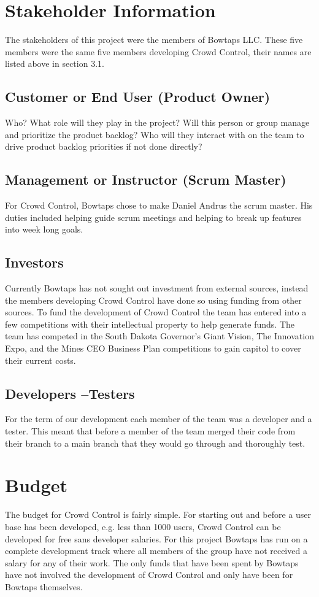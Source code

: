 \section{ Stakeholder Information}
The stakeholders of this project were the members of Bowtaps LLC.  These five members were the same five members developing Crowd Control, their names are listed above in section 3.1.


\subsection{Customer or End User (Product Owner)}
Who?  What role will they play in the project?  Will this person or group manage 
and prioritize the product backlog?  Who will they interact with on the team to 
drive product backlog priorities if not done directly? 

\subsection{Management or Instructor (Scrum Master)}
For Crowd Control, Bowtaps chose to make Daniel Andrus the scrum master. His duties included helping guide scrum meetings and helping to break up features into week long goals.


\subsection{Investors}
Currently Bowtaps has not sought out investment from external sources, instead the members developing Crowd Control have done so using funding from other sources.  To fund the development of Crowd Control the team has entered into a few competitions with their intellectual property to help generate funds.   The team has competed in the South Dakota Governor's Giant Vision, The Innovation Expo, and the Mines CEO Business Plan competitions to gain capitol to cover their current costs.


\subsection{Developers --Testers}
For the term of our development each member of the team was a developer and a tester.  This meant that before a member of the team merged their code from their branch to a main branch that they would go through and thoroughly test.

\section{Budget}
The budget for Crowd Control is fairly simple.  For starting out and before a user base has been developed, e.g. less than 1000 users, Crowd Control can be developed for free sans developer salaries.  For this project Bowtaps has run on a complete development track where all members of the group have not received a salary for any of their work.  The only funds that have been spent by Bowtaps have not involved the development of Crowd Control and only have been for Bowtaps themselves.

